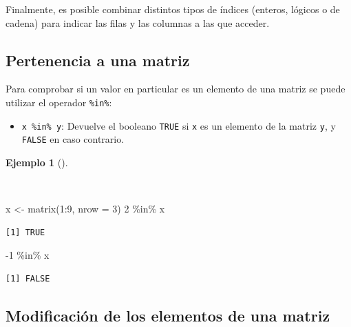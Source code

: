 \documentclass[
  a4paper,
]{scrreport}
\newenvironment{Shaded}{\begin{snugshade}}{\end{snugshade}}
\newcommand{\AttributeTok}[1]{\textcolor[rgb]{0.40,0.45,0.13}{#1}}
\newcommand{\DecValTok}[1]{\textcolor[rgb]{0.68,0.00,0.00}{#1}}
\newcommand{\FunctionTok}[1]{\textcolor[rgb]{0.28,0.35,0.67}{#1}}
\newcommand{\NormalTok}[1]{\textcolor[rgb]{0.00,0.23,0.31}{#1}}
\newcommand{\OtherTok}[1]{\textcolor[rgb]{0.00,0.23,0.31}{#1}}
\newcommand{\SpecialCharTok}[1]{\textcolor[rgb]{0.37,0.37,0.37}{#1}}
\providecommand{\tightlist}{%
  \setlength{\itemsep}{0pt}\setlength{\parskip}{0pt}}\usepackage{longtable,booktabs,array}
\theoremstyle{definition}
\theoremstyle{definition}
\newtheorem{example}{Ejemplo}[chapter]
\theoremstyle{remark}
\begin{document}
Finalmente, es posible combinar distintos tipos de índices (enteros,
lógicos o de cadena) para indicar las filas y las columnas a las que
acceder.

\hypertarget{pertenencia-a-una-matriz}{%
\subsection{Pertenencia a una matriz}\label{pertenencia-a-una-matriz}}

Para comprobar si un valor en particular es un elemento de una matriz se
puede utilizar el operador \texttt{\%in\%}:

\begin{itemize}
\tightlist
\item
  \texttt{x\ \%in\%\ y}: Devuelve el booleano \texttt{TRUE} si
  \texttt{x} es un elemento de la matriz \texttt{y}, y \texttt{FALSE} en
  caso contrario.
\end{itemize}

\begin{example}[]\protect\hypertarget{exm-pertenencia-matriz}{}\label{exm-pertenencia-matriz}

~

\begin{Shaded}
\begin{Highlighting}[]
\NormalTok{x }\OtherTok{\textless{}{-}} \FunctionTok{matrix}\NormalTok{(}\DecValTok{1}\SpecialCharTok{:}\DecValTok{9}\NormalTok{, }\AttributeTok{nrow =} \DecValTok{3}\NormalTok{)}
\DecValTok{2} \SpecialCharTok{\%in\%}\NormalTok{ x}
\end{Highlighting}
\end{Shaded}

\begin{verbatim}
[1] TRUE
\end{verbatim}

\begin{Shaded}
\begin{Highlighting}[]
\SpecialCharTok{{-}}\DecValTok{1} \SpecialCharTok{\%in\%}\NormalTok{ x}
\end{Highlighting}
\end{Shaded}

\begin{verbatim}
[1] FALSE
\end{verbatim}

\end{example}

\hypertarget{modificaciuxf3n-de-los-elementos-de-una-matriz}{%
\subsection{Modificación de los elementos de una
matriz}\label{modificaciuxf3n-de-los-elementos-de-una-matriz}}
\end{document}
